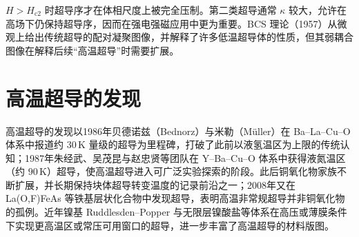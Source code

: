 $H>H_{\mathrm{c2}}$ 时超导序才在体相尺度上被完全压制。第二类超导通常 $\kappa$ 较大，允许在高场下仍保持超导序，因而在强电强磁应用中更为重要。BCS 理论（1957）从微观上给出传统超导的配对凝聚图像，并解释了许多低温超导体的性质，但其弱耦合图像在解释后续``高温超导''时需要扩展。\section{高温超导的发现}高温超导的发现以1986年贝德诺兹（Bednorz）与米勒（M\"uller）在 Ba--La--Cu--O 体系中报道约 $30\,\mathrm{K}$ 量级的超导为里程碑，打破了此前以液氢温区为上限的传统认知；1987年朱经武、吴茂昆与赵忠贤等团队在 Y--Ba--Cu--O 体系中获得液氮温区（约 $90\,\mathrm{K}$）超导，使高温超导进入可广泛实验探索的阶段。此后铜氧化物家族不断扩展，并长期保持块体超导转变温度的记录前沿之一；2008年又在 La(O,F)FeAs 等铁基层状化合物中发现超导，表明高温非常规超导并非铜氧化物的孤例。近年镍基 Ruddlesden--Popper 与无限层镍酸盐等体系在高压或薄膜条件下实现更高温区或常压可用窗口的超导，进一步丰富了高温超导的材料版图。

